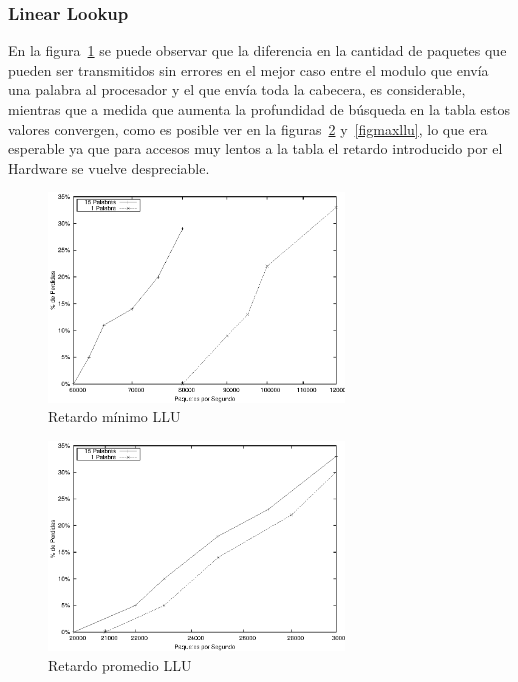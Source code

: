 \subsubsection{Linear Lookup}
En la figura~\ref{figminllu} se puede observar que la diferencia en la cantidad de paquetes que pueden ser transmitidos sin errores en el mejor caso entre el modulo que envía una palabra al procesador y el que envía toda la cabecera, es considerable, mientras que a medida que aumenta la profundidad de búsqueda en la tabla estos valores convergen, como es posible ver en la figuras~\ref{figpromllu} y~\ref{figmaxllu}, lo que era esperable ya que para accesos muy lentos a la tabla el retardo introducido por el Hardware se vuelve despreciable.
\newpage
\begin{figure}[!h]
  \centering
	\includegraphics[width=0.7\textwidth]{5-resultados/graf/llumin.eps}
  \caption{Retardo mínimo LLU}
  \label{figminllu}
\end{figure}
\begin{figure}[!h]
  \centering
	\includegraphics[width=0.7\textwidth]{5-resultados/graf/lluprom.eps}
  \caption{Retardo promedio LLU}
  \label{figpromllu}
\newpage
\end{figure}
